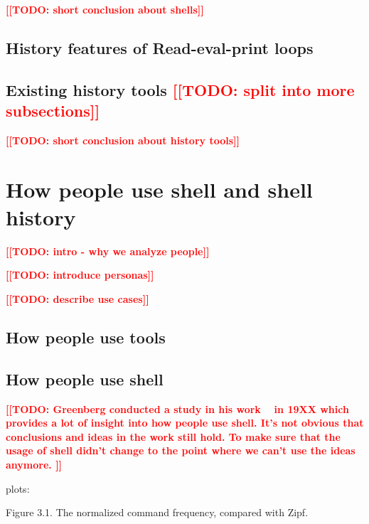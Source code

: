 \documentclass[thesis=M,english]{FITthesis}[2012/10/20]
\newcommand{\todotext}[1]{\textcolor{red}{\textbf{[[#1]]}}}
\newcommand{\blind}[1][1]{\textcolor{mygray}{\Blindtext[#1][1]}}
\let\myCite\cite
\renewcommand\cite{\unskip~\myCite}
\begin{document}
\blind[4]

\todotext{TODO: short conclusion about shells}

\subsection{History features of Read-eval-print loops}

\blind[1]

\subsection{Existing history tools \todotext{TODO: split into more subsections}}

\blind[4]

\todotext{TODO: short conclusion about history tools}

\section{How people use shell and shell history}

\todotext{TODO: intro - why we analyze people}

\blind

\todotext{TODO: introduce personas}

\todotext{TODO: describe use cases}

\blind[2]

\subsection{How people use tools}

\blind[2]

\subsection{How people use shell}

\todotext{TODO: Greenberg conducted a study in his work \cite{greenberg1993computer} in 19XX which provides a lot of insight into how people use shell. It's not obvious that conclusions and ideas in the work still hold. To make sure that the usage of shell didn't change to the point where we can't use the ideas anymore. }

plots:

Figure 3.1. The normalized command frequency, compared with Zipf.
\end{document}
